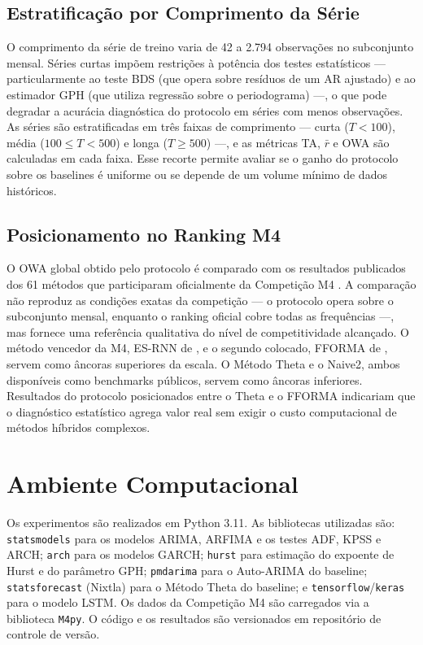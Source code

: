 \documentclass[
  12pt,
  openright,
  twoside,
  a4paper,
  english,
  brazil
]{abntex2}
\begin{document}
\subsection{Estratificação por Comprimento da Série}
\label{subsec:analise-comprimento}

O comprimento da série de treino varia de 42 a 2.794 observações no subconjunto mensal. Séries curtas impõem restrições à potência dos testes estatísticos — particularmente ao teste BDS (que opera sobre resíduos de um AR ajustado) \cite{broock1996test} e ao estimador GPH (que utiliza regressão sobre o periodograma) \cite{geweke1983estimation} —, o que pode degradar a acurácia diagnóstica do protocolo em séries com menos observações. As séries são estratificadas em três faixas de comprimento — curta ($T < 100$), média ($100 \leq T < 500$) e longa ($T \geq 500$) —, e as métricas TA, $\bar{r}$ e OWA são calculadas em cada faixa. Esse recorte permite avaliar se o ganho do protocolo sobre os baselines é uniforme ou se depende de um volume mínimo de dados históricos.

\subsection{Posicionamento no Ranking M4}
\label{subsec:ranking-m4}

O OWA global obtido pelo protocolo é comparado com os resultados publicados dos 61 métodos que participaram oficialmente da Competição M4 \cite{makridakis2020m4}. A comparação não reproduz as condições exatas da competição — o protocolo opera sobre o subconjunto mensal, enquanto o ranking oficial cobre todas as frequências —, mas fornece uma referência qualitativa do nível de competitividade alcançado. O método vencedor da M4, ES-RNN de , e o segundo colocado, FFORMA de , servem como âncoras superiores da escala. O Método Theta e o Naive2, ambos disponíveis como benchmarks públicos, servem como âncoras inferiores. Resultados do protocolo posicionados entre o Theta e o FFORMA indicariam que o diagnóstico estatístico agrega valor real sem exigir o custo computacional de métodos híbridos complexos.

\section{Ambiente Computacional}
\label{sec:ambiente}

Os experimentos são realizados em Python 3.11. As bibliotecas utilizadas são: \texttt{statsmodels} para os modelos ARIMA, ARFIMA e os testes ADF, KPSS e ARCH; \texttt{arch} para os modelos GARCH; \texttt{hurst} para estimação do expoente de Hurst e do parâmetro GPH; \texttt{pmdarima} para o Auto-ARIMA do baseline; \texttt{statsforecast} (Nixtla) para o Método Theta do baseline; e \texttt{tensorflow}/\texttt{keras} para o modelo LSTM. Os dados da Competição M4 são carregados via a biblioteca \texttt{M4py}. O código e os resultados são versionados em repositório de controle de versão.


\end{document}
